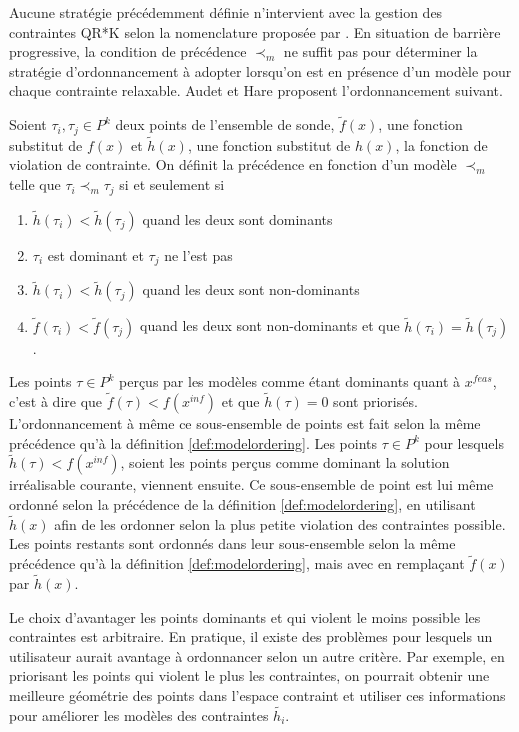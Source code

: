 Aucune stratégie précédemment définie n'intervient avec la gestion des contraintes \textsf{QR*K}  selon la nomenclature proposée par \cite{LedWild2015}. En situation de barrière progressive, la condition de précédence $\prec_m$ ne suffit pas pour déterminer la stratégie d'ordonnancement à adopter lorsqu'on est en présence d'un modèle pour chaque contrainte relaxable. Audet et Hare \cite{AuHa2018} proposent l'ordonnancement suivant. 
\begin{definition}
	\label{def:modelOrderingProgBar}
	Soient $\tau_i,\tau_j \in P^k$ deux points de l'ensemble de sonde, $\tilde{f}(x)$, une fonction substitut de $f(x)$ et $\tilde{h}(x)$, une fonction substitut de $h(x)$, la fonction de violation de contrainte. On définit la précédence en fonction d'un modèle $\prec_m$ telle que $\tau_i \prec_m \tau_j$ si et seulement si 
	\begin{enumerate}[label=\roman*.]
		\item $\tilde{h}(\tau_i) < \tilde{h}(\tau_j)$ quand les deux sont dominants
		\item $\tau_i$ est dominant et $\tau_j$ ne l'est pas
		\item $\tilde{h}(\tau_i) < \tilde{h}(\tau_j)$ quand les deux sont non-dominants
		\item $\tilde{f}(\tau_i) < \tilde{f}(\tau_j)$ quand les deux sont non-dominants et que $\tilde{h}(\tau_i) = \tilde{h}(\tau_j)$.
	\end{enumerate}
\end{definition}
Les points $\tau \in P^k$ perçus par les modèles comme étant dominants quant à $x^{feas}$, c'est à dire que $\tilde{f}(\tau) < f(x^{inf})$ et que $\tilde{h}(\tau) = 0$ sont priorisés. L'ordonnancement à même ce sous-ensemble de points est fait selon la même précédence qu'à la définition \ref{def:modelordering}.
Les points $\tau \in P^k$ pour lesquels $\tilde{h}(\tau) < f(x^{inf})$, soient les points perçus comme dominant la solution irréalisable courante, viennent ensuite. Ce sous-ensemble de point est lui même ordonné selon la précédence de la définition \ref{def:modelordering}, en utilisant $\tilde{h}(x)$ afin de les ordonner selon la plus petite violation des contraintes possible. Les points restants sont ordonnés dans leur sous-ensemble selon la même précédence qu'à la définition  \ref{def:modelordering}, mais avec en remplaçant $\tilde{f}(x)$ par $\tilde{h}(x)$.

Le choix d'avantager les points dominants et qui violent le moins possible les contraintes est arbitraire. En pratique, il existe des problèmes pour lesquels un utilisateur aurait avantage à ordonnancer selon un autre critère. Par exemple, en priorisant les points qui violent le plus les contraintes, on pourrait obtenir une meilleure géométrie des points dans l'espace contraint et utiliser ces informations pour améliorer les modèles des contraintes $\tilde{h_i}$.
 
